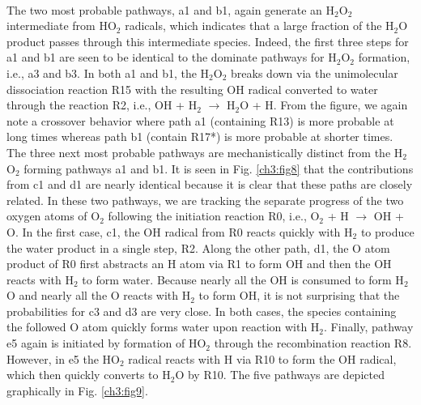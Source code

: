 \paragraph{}
The two most probable pathways, a1 and b1, again generate
an H$_2$O$_2$ intermediate from HO$_2$ radicals, which indicates that a
large fraction of the H$_2$O product passes through this
intermediate species. Indeed, the first three steps for a1 and
b1 are seen to be identical to the dominate pathways for H$_2$O$_2$
formation, i.e., a3 and b3. In both a1 and b1, the H$_2$O$_2$ breaks
down via the unimolecular dissociation reaction R15 with the
resulting OH radical converted to water through the reaction
R2, i.e., OH + H$_2$ $\rightarrow$ H$_2$O + H. From the figure, we again note a crossover behavior where path a1 (containing R13) is more
probable at long times whereas path b1 (contain R17*) is more
probable at shorter times. The three next most probable
pathways are mechanistically distinct from the H$_2$O$_2$ forming
pathways a1 and b1. It is seen in Fig. \ref{ch3:fig8} that the contributions
from c1 and d1 are nearly identical because it is clear that these
paths are closely related. In these two pathways, we are tracking
the separate progress of the two oxygen atoms of O$_2$ following
the initiation reaction R0, i.e., O$_2$ + H $\rightarrow$ OH + O. In the first
case, c1, the OH radical from R0 reacts quickly with H$_2$ to
produce the water product in a single step, R2. Along the other
path, d1, the O atom product of R0 first abstracts an H atom
via R1 to form OH and then the OH reacts with H$_2$ to form
water. Because nearly all the OH is consumed to form H$_2$O and
nearly all the O reacts with H$_2$ to form OH, it is not surprising
that the probabilities for c3 and d3 are very close. In both cases,
the species containing the followed O atom quickly forms water
upon reaction with H$_2$. Finally, pathway e5 again is initiated by
formation of HO$_2$ through the recombination reaction R8.
However, in e5 the HO$_2$ radical reacts with H via R10 to form
the OH radical, which then quickly converts to H$_2$O by R10.
The five pathways are depicted graphically in Fig. \ref{ch3:fig9}.
\newline
